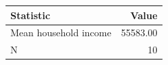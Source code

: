 \begin{tabular}{lr}
\toprule
Statistic & Value \\
\midrule
Mean household income & 55583.00 \\
N & 10 \\
\bottomrule
\end{tabular}
